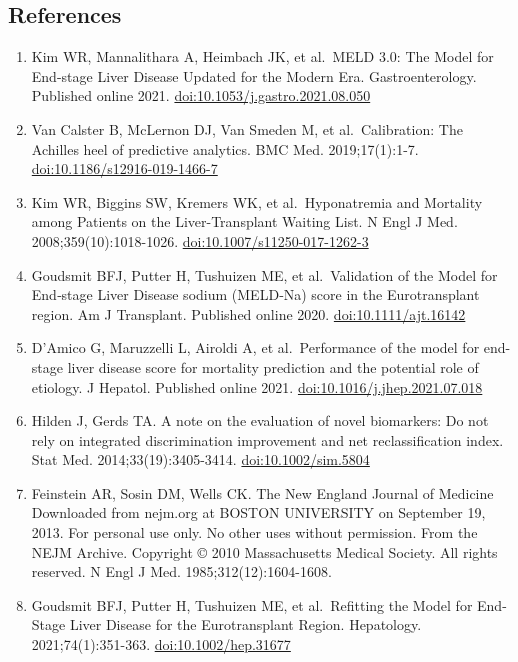 \documentclass[11pt,english,]{book} %
\providecommand{\tightlist}{%
  \setlength{\itemsep}{0pt}\setlength{\parskip}{0pt}}
\begin{document}
\linespread{1}
\small

\hypertarget{references-7}{%
\subsection*{References}\label{references-7}}

\begin{enumerate}
\def\labelenumi{\arabic{enumi}.}
\tightlist
\item
  Kim WR, Mannalithara A, Heimbach JK, et al.~MELD 3.0: The Model for End-stage Liver Disease Updated for the Modern Era. Gastroenterology. Published online 2021. \url{doi:10.1053/j.gastro.2021.08.050}
\item
  Van Calster B, McLernon DJ, Van Smeden M, et al.~Calibration: The Achilles heel of predictive analytics. BMC Med. 2019;17(1):1-7. \url{doi:10.1186/s12916-019-1466-7}
\item
  Kim WR, Biggins SW, Kremers WK, et al.~Hyponatremia and Mortality among Patients on the Liver-Transplant Waiting List. N Engl J Med. 2008;359(10):1018-1026. \url{doi:10.1007/s11250-017-1262-3}
\item
  Goudsmit BFJ, Putter H, Tushuizen ME, et al.~Validation of the Model for End‐stage Liver Disease sodium (MELD‐Na) score in the Eurotransplant region. Am J Transplant. Published online 2020. \url{doi:10.1111/ajt.16142}
\item
  D'Amico G, Maruzzelli L, Airoldi A, et al.~Performance of the model for end-stage liver disease score for mortality prediction and the potential role of etiology. J Hepatol. Published online 2021. \url{doi:10.1016/j.jhep.2021.07.018}
\item
  Hilden J, Gerds TA. A note on the evaluation of novel biomarkers: Do not rely on integrated discrimination improvement and net reclassification index. Stat Med. 2014;33(19):3405-3414. \url{doi:10.1002/sim.5804}
\item
  Feinstein AR, Sosin DM, Wells CK. The New England Journal of Medicine Downloaded from nejm.org at BOSTON UNIVERSITY on September 19, 2013. For personal use only. No other uses without permission. From the NEJM Archive. Copyright © 2010 Massachusetts Medical Society. All rights reserved. N Engl J Med. 1985;312(12):1604-1608.
\item
  Goudsmit BFJ, Putter H, Tushuizen ME, et al.~Refitting the Model for End-Stage Liver Disease for the Eurotransplant Region. Hepatology. 2021;74(1):351-363. \url{doi:10.1002/hep.31677}
\end{enumerate}
\end{document}
